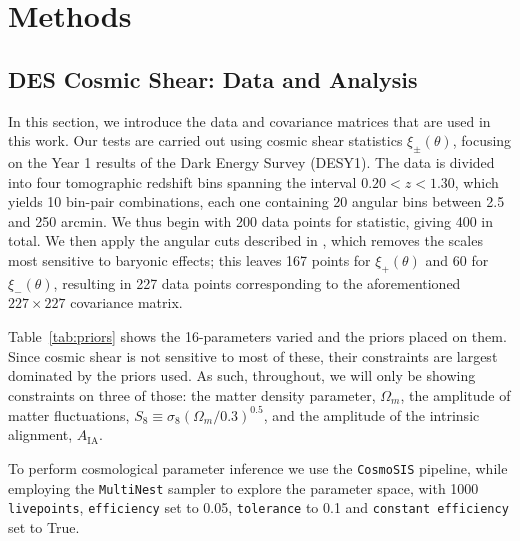 \documentclass[twocolumn,nofootinbib]{\docclass}
\begin{document}
	\section{Methods}
	\label{sec:methods}
	
	\subsection{DES Cosmic Shear: Data and Analysis}
	\label{subsec:data_and_analysis}
	
	In this section, we introduce the data and covariance matrices that are used in this work. Our tests are carried out using cosmic shear statistics $\xi_\pm(\theta)$, focusing on the Year 1 results of the Dark Energy Survey \citep{Troxel:2017xyo,Abbott:2018cms} (DESY1). The data is divided into four tomographic redshift bins spanning the interval $0.20 < z < 1.30$, which yields 10 bin-pair combinations, each one containing 20 angular bins between 2.5 and 250 arcmin. We thus begin with 200 data points for statistic, giving 400 in total. We then apply the angular cuts described in \citep{Abbott:2018cms}, which removes the scales most sensitive to baryonic effects; this leaves 167 points for $\xi_+(\theta)$ and 60 for $\xi_-(\theta)$, resulting in 227 data points corresponding to the aforementioned $227 \times 227$ covariance matrix. 
	
	Table~\ref{tab:priors} shows the 16-parameters varied and the priors placed on them. Since cosmic shear is not sensitive to most of these, their constraints are largest dominated by the priors used. As such, throughout, we will only be showing constraints on three of those: the matter density parameter, $\Omega_m$, the amplitude of matter fluctuations, $S_8 \equiv \sigma_8 (\Omega_m/0.3)^{0.5}$, and the amplitude of the intrinsic alignment, $A_{\mathrm{IA}}$.
	
	To perform cosmological parameter inference we use the {\tt CosmoSIS} \citep{Zuntz:2015med, Lewis:2000taj, Kirk:2012mnras, Kilbinger:2009aa, Howlett:2012jcap, Bridle:2007njp, Takahashi:2012taj, Smith:2003mnras} pipeline, while employing the {\tt MultiNest} \citep{Feroz:2009fhb} sampler to explore the parameter space, with 1000 {\tt livepoints}, {\tt efficiency} set to 0.05, {\tt tolerance} to 0.1 and {\tt constant efficiency} set to True.
	
\end{document}
